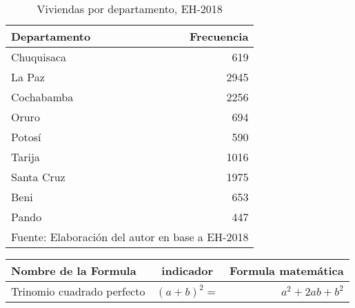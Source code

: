 \documentclass{article}
\begin{document}
\begin{table}[ht]
\caption{Viviendas por departamento, EH-2018}
\centering
\begin{tabular}{lr}
  \hline
Departamento & Frecuencia \\ 
  \hline
    \hline
Chuquisaca & 619 \\ 
\cellcolor{blue}  La Paz & 2945 \\ 
  Cochabamba & 2256 \\ 
  Oruro & 694 \\ 
  Potosí & 590 \\ 
  Tarija & 1016 \\ 
  Santa Cruz & 1975 \\ 
  Beni & 653 \\ 
  Pando & 447 \\ 
   \hline
\multicolumn{2}{l}{Fuente: Elaboración del autor en base a EH-2018}   
\end{tabular}

\end{table}





\begin{tabular}{lcr}
\hline
Nombre de la Formula & indicador & Formula matemática\\
\hline
\hline
Trinomio cuadrado perfecto & $(a+b)^2=$ & $a^2+2ab+b^2$ \\
 \hline

\end{tabular}



\end{document}
